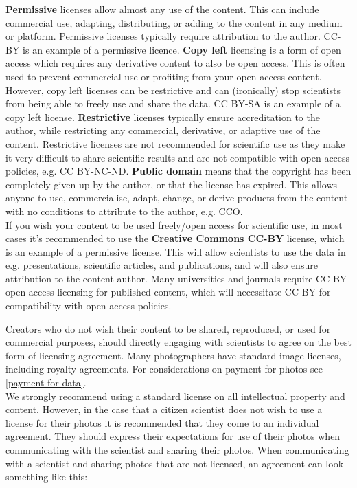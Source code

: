 \documentclass{article}
\begin{document}
\textbf{Permissive} licenses allow almost any use of the content. This can include commercial use, adapting, distributing, or adding to the content in any medium or platform. Permissive licenses typically require attribution to the author. CC-BY is an example of a permissive licence.
\textbf{Copy left} licensing is a form of open access which requires any derivative content to also be open access. This is often used to prevent commercial use or profiting from your open access content. However, copy left licenses can be restrictive and can (ironically) stop scientists from being able to freely use and share the data. CC BY-SA is an example of a copy left license.
\textbf{Restrictive} licenses typically ensure accreditation to the author, while restricting any commercial, derivative, or adaptive use of the content. Restrictive licenses are not recommended for scientific use as they make it very difficult to share scientific results and are not compatible with open access policies, e.g. CC BY-NC-ND.
\textbf{Public domain} means that the copyright has been completely given up by the author, or that the license has expired. This allows anyone to use, commercialise, adapt, change, or derive products from the content with no conditions to attribute to the author, e.g. CCO. \\

If you wish your content to be used freely/open access for scientific use, in most cases it's recommended to use the \textbf{Creative Commons CC-BY} license, which is an example of a permissive license. This will allow scientists to use the data in e.g. presentations, scientific articles, and publications, and will also ensure attribution to the content author. Many universities and journals require CC-BY open access licensing for published content, which will necessitate CC-BY for compatibility with open access policies.

Creators who do not wish their content to be shared, reproduced, or used for commercial purposes, should directly engaging with scientists to agree on the best form of licensing agreement. Many photographers have standard image licenses, including royalty agreements. For considerations on payment for photos see \ref{payment-for-data}. \\

We strongly recommend using a standard license on all intellectual property and content. However, in the case that a citizen scientist does not wish to use a license for their photos it is recommended that they come to an individual agreement. They should express their expectations for use of their photos when communicating with the scientist and sharing their photos. When communicating with a scientist and sharing photos that are not licensed, an agreement can look something like this:
\end{document}
